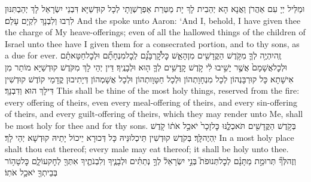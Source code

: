{וּמַלֵּיל יְיָ עִם אַהֲרֹן וַאֲנָא הָא יְהַבִית לָךְ יָת מַטְּרַת אַפְרָשְׁוָתָי לְכָל קוּדְשַׁיָּא דִּבְנֵי יִשְׂרָאֵל לָךְ יְהַבְתִּנּוּן לִרְבוּ וְלִבְנָךְ לִקְיָם עָלַם׃}
{And the \lord\space spoke unto Aaron: ‘And I, behold, I have given thee the charge of My heave-offerings; even of all the hallowed things of the children of Israel unto thee have I given them for a consecrated portion, and to thy sons, as a due for ever.}{}
{זֶֽה\maqqaf יִהְיֶ֥ה לְךָ֛ מִקֹּ֥דֶשׁ הַקֳּדָשִׁ֖ים מִן\maqqaf הָאֵ֑שׁ כׇּל\maqqaf קׇ֠רְבָּנָ֠ם לְֽכׇל\maqqaf מִנְחָתָ֞ם וּלְכׇל\maqqaf חַטָּאתָ֗ם וּלְכׇל\maqqaf אֲשָׁמָם֙ אֲשֶׁ֣ר יָשִׁ֣יבוּ לִ֔י קֹ֣דֶשׁ קׇֽדָשִׁ֥ים לְךָ֛ ה֖וּא וּלְבָנֶֽיךָ׃}
{דֵּין יְהֵי לָךְ מִקֹּדֶשׁ קוּדְשַׁיָּא מוֹתַר מִן אִישָׁתָא כָּל קוּרְבָּנְהוֹן לְכָל מִנְחָוָתְהוֹן וּלְכָל חַטָּוָותְהוֹן וּלְכָל אֲשָׁמְהוֹן דְּיָתִיבוּן קֳדָמַי קוֹדֶשׁ קוּדְשִׁין דִּילָךְ הוּא וְדִבְנָךְ׃}
{This shall be thine of the most holy things, reserved from the fire: every offering of theirs, even every meal-offering of theirs, and every sin-offering of theirs, and every guilt-offering of theirs, which they may render unto Me, shall be most holy for thee and for thy sons.}{}
{בְּקֹ֥דֶשׁ הַקֳּדָשִׁ֖ים תֹּאכְלֶ֑נּוּ כׇּל\maqqaf זָכָר֙ יֹאכַ֣ל אֹת֔וֹ קֹ֖דֶשׁ יִֽהְיֶה\maqqaf לָּֽךְ׃}
{בְּקֹדֶשׁ קוּדְשִׁין תֵּיכְלוּנֵּיהּ כָּל דְּכוּרָא יֵיכוֹל יָתֵיהּ קוּדְשָׁא יְהֵי לָךְ׃}
{In a most holy place shalt thou eat thereof; every male may eat thereof; it shall be holy unto thee.}{}
{וְזֶה\maqqaf לְּךָ֞ תְּרוּמַ֣ת מַתָּנָ֗ם לְכׇל\maqqaf תְּנוּפֹת֮ בְּנֵ֣י יִשְׂרָאֵל֒ לְךָ֣ נְתַתִּ֗ים וּלְבָנֶ֧יךָ וְלִבְנֹתֶ֛יךָ אִתְּךָ֖ לְחׇק\maqqaf עוֹלָ֑ם כׇּל\maqqaf טָה֥וֹר בְּבֵיתְךָ֖ יֹאכַ֥ל אֹתֽוֹ׃}
